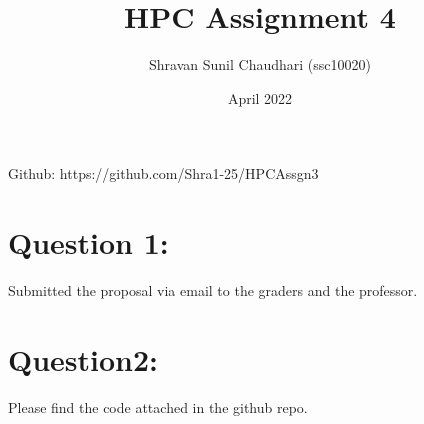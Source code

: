 \documentclass{article}
\title{\textbf{HPC Assignment 4}}
\author{Shravan Sunil Chaudhari (ssc10020)}
\date{April 2022}
\begin{document}
\maketitle
Github: https://github.com/Shra1-25/HPCAssgn3

\section{Question 1: }
Submitted the proposal via email to the graders and the professor.
\section{Question2: }
Please find the code attached in the github repo.



\end{document}
